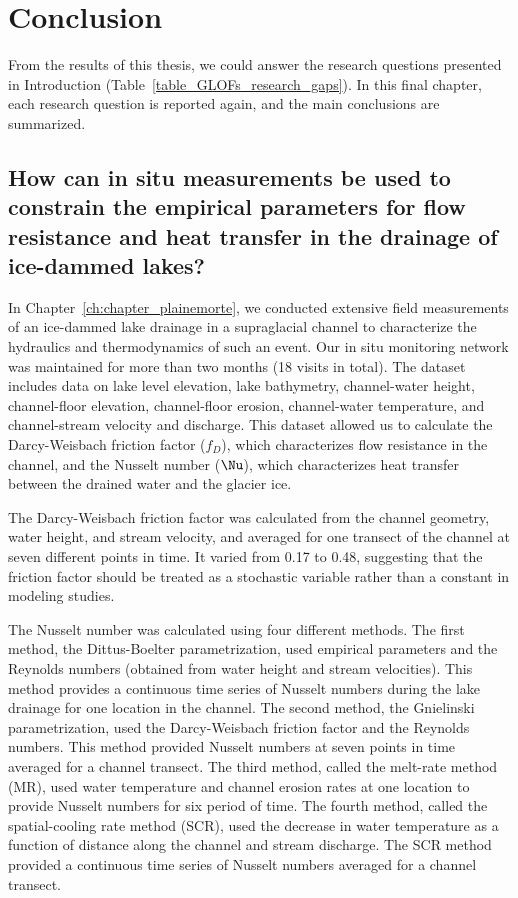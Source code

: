 \chapter{Conclusion}
\label{ch:summary}

From the results of this thesis, we could answer the research questions presented in Introduction (Table~\ref{table_GLOFs_research_gaps}). In this final chapter, each research question is reported again, and the main conclusions are summarized.

\section{How can in situ measurements be used to constrain the empirical parameters for flow resistance and heat transfer in the drainage of ice-dammed lakes?}

In Chapter~\ref{ch:chapter_plainemorte}, we conducted extensive field measurements of an ice-dammed lake drainage in a supraglacial channel to characterize the hydraulics and thermodynamics of such an event. Our in situ monitoring network was maintained for more than two months (18 visits in total). The dataset includes data on lake level elevation, lake bathymetry, channel-water height, channel-floor elevation, channel-floor erosion, channel-water temperature, and channel-stream velocity and discharge. This dataset allowed us to calculate the Darcy-Weisbach friction factor ($f_D$), which characterizes flow resistance in the channel, and the Nusselt number ($\Nu$), which characterizes heat transfer between the drained water and the glacier ice.
%

The Darcy-Weisbach friction factor was calculated from the channel geometry, water height, and stream velocity, and averaged for one transect of the channel at seven different points in time. It varied from 0.17 to 0.48, suggesting that the friction factor should be treated as a stochastic variable rather than a constant in modeling studies.
%

The Nusselt number was calculated using four different methods. The first method, the Dittus-Boelter parametrization, used empirical parameters and the Reynolds numbers (obtained from water height and stream velocities). This method provides a continuous time series of Nusselt numbers during the lake drainage for one location in the channel. The second method, the Gnielinski parametrization, used the Darcy-Weisbach friction factor and the Reynolds numbers. This method provided Nusselt numbers at seven points in time averaged for a channel transect. The third method, called the melt-rate method (MR), used water temperature and channel erosion rates at one location to provide Nusselt numbers for six period of time. The fourth method, called the spatial-cooling rate method (SCR), used the decrease in water temperature as a function of distance along the channel and stream discharge. The SCR method provided a continuous time series of Nusselt numbers averaged for a channel transect.
%

